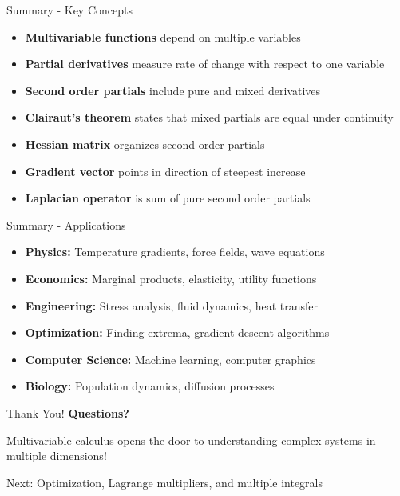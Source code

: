 \documentclass[aspectratio=169]{beamer}
\begin{document}
\begin{frame}{Summary - Key Concepts}
\begin{itemize}
    \item \textbf{Multivariable functions} depend on multiple variables
    \item \textbf{Partial derivatives} measure rate of change with respect to one variable
    \item \textbf{Second order partials} include pure and mixed derivatives
    \item \textbf{Clairaut's theorem} states that mixed partials are equal under continuity
    \item \textbf{Hessian matrix} organizes second order partials
    \item \textbf{Gradient vector} points in direction of steepest increase
    \item \textbf{Laplacian operator} is sum of pure second order partials
\end{itemize}
\end{frame}

\begin{frame}{Summary - Applications}
\begin{itemize}
    \item \textbf{Physics:} Temperature gradients, force fields, wave equations
    \item \textbf{Economics:} Marginal products, elasticity, utility functions
    \item \textbf{Engineering:} Stress analysis, fluid dynamics, heat transfer
    \item \textbf{Optimization:} Finding extrema, gradient descent algorithms
    \item \textbf{Computer Science:} Machine learning, computer graphics
    \item \textbf{Biology:} Population dynamics, diffusion processes
\end{itemize}
\end{frame}

\begin{frame}{Thank You!}
\centering
\vspace{2cm}
{\Huge \textcolor{myblue}{\textbf{Questions?}}}

\vspace{1cm}
{\Large Multivariable calculus opens the door to understanding complex systems in multiple dimensions!}

\vspace{0.5cm}
{\large \textcolor{myorange}{Next: Optimization, Lagrange multipliers, and multiple integrals}}
\end{frame}
\end{document}
